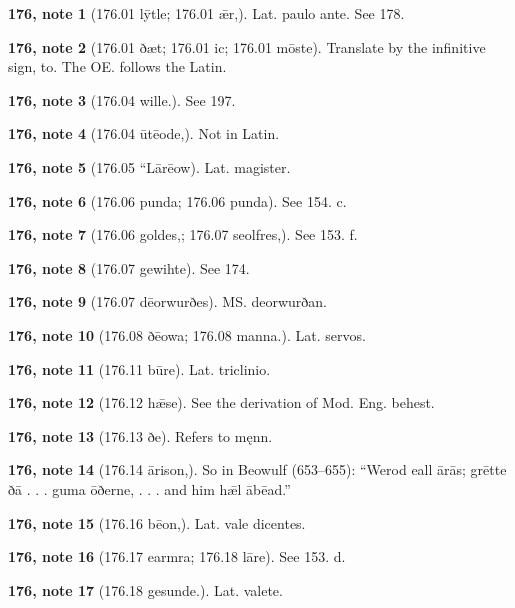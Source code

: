 \textbf{176, note 1} (176.01 lȳtle; 176.01 ǣr,). Lat. paulo ante. See 178.

\textbf{176, note 2} (176.01 ðæt; 176.01 ic; 176.01 mōste). Translate by the infinitive sign, to. The OE. follows the Latin.

\textbf{176, note 3} (176.04 wille.). See 197.

\textbf{176, note 4} (176.04 ūtēode,). Not in Latin.

\textbf{176, note 5} (176.05 “Lārēow). Lat. magister.

\textbf{176, note 6} (176.06 punda; 176.06 punda). See 154. c.

\textbf{176, note 7} (176.06 goldes,; 176.07 seolfres,). See 153. f.

\textbf{176, note 8} (176.07 gewihte). See 174.

\textbf{176, note 9} (176.07 dēorwurðes). MS. deorwurðan.

\textbf{176, note 10} (176.08 ðēowa; 176.08 manna.). Lat. servos.

\textbf{176, note 11} (176.11 būre). Lat. triclinio.

\textbf{176, note 12} (176.12 hǣse). See the derivation of Mod. Eng. behest.

\textbf{176, note 13} (176.13 ðe). Refers to męnn.

\textbf{176, note 14} (176.14 ārison,). So in Beowulf (653–655): “Werod eall ārās; grētte ðā . . . guma ōðerne, . . . and him hǣl ābēad.”

\textbf{176, note 15} (176.16 bēon,). Lat. vale dicentes.

\textbf{176, note 16} (176.17 earmra; 176.18 lāre). See 153. d.

\textbf{176, note 17} (176.18 gesunde.). Lat. valete.

